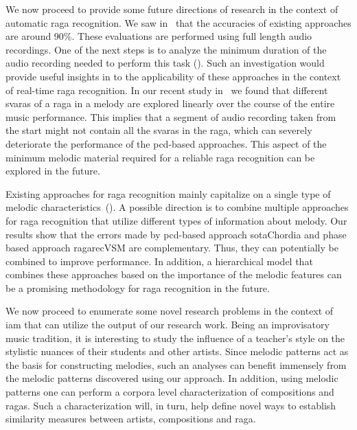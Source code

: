 We now proceed to provide some future directions of research in the context of automatic \gls{raga} recognition. We saw in~ that the accuracies of existing approaches are around 90\%. These evaluations are performed using full length audio recordings. One of the next steps is to analyze the minimum duration of the audio recording needed to perform this task (\cite{balkwill1999cross}). Such an investigation would provide useful insights in to the applicability of these approaches in the context of real-time \gls{raga} recognition. In our recent study in~\cite{kaustuv_ismir_2016} we found that different \glspl{svara} of a \gls{raga} in a melody are explored linearly over the course of the entire music performance. This implies that a segment of audio recording taken from the start might not contain all the \glspl{svara} in the \gls{raga}, which can severely deteriorate the performance of the \gls{pcd}-based approaches. This aspect of the minimum melodic material required for a reliable \gls{raga} recognition can be explored in the future. 

Existing approaches for \gls{raga} recognition mainly capitalize on a single type of melodic characteristics~(). A possible direction is to combine multiple approaches for \gls{raga} recognition that utilize different types of information about melody. Our results show that the errors made by \gls{pcd}-based approach \acrshort{sotaChordia} and phase based approach \acrshort{ragarecVSM} are complementary. Thus, they can potentially be combined to improve performance. In addition, a hierarchical model that combines these approaches based on the importance of the melodic features can be a promising methodology for \gls{raga} recognition in the future.

We now proceed to enumerate some novel research problems in the context of \gls{iam} that can utilize the output of our research work. Being an improvisatory music tradition, it is interesting to study the influence of a teacher’s style on the stylistic nuances of their students and other artists. Since melodic patterns act as the basis for constructing melodies, such an analyses can benefit immensely from the melodic patterns discovered using our approach. In addition, using melodic patterns one can perform a corpora level characterization of compositions and \glspl{raga}. Such a characterization will, in turn, help define novel ways to establish similarity measures between artists, compositions and \gls{raga}.

